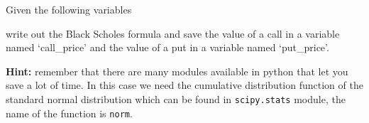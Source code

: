 \begin{Exercise}[label={ex:BS1}]
Given the following variables

\begin{Shaded}
\begin{Highlighting}[]
\OperatorTok{=}  
\OperatorTok{=}  
\OperatorTok{=}  
\OperatorTok{=}  
\OperatorTok{=}  
\end{Highlighting}
\end{Shaded}

write out the Black Scholes formula and save the value of a call in a variable named `call\_price' and the value of a put in a variable named `put\_price'.

\textbf{Hint:} remember that there are many modules available in python that let you save a lot of time. In this case we need the cumulative distribution function of the standard normal distribution which can be found in \texttt{scipy.stats} module, the name of the function is \texttt{norm}.
\end{Exercise}

